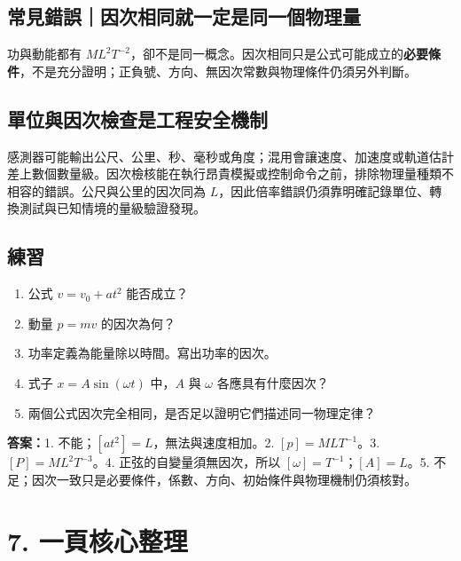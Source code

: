 \documentclass[11pt,a4paper]{article}
\providecommand{\tightlist}{%
  \setlength{\itemsep}{0pt}\setlength{\parskip}{0pt}}
\begin{document}
\subsection{常見錯誤｜因次相同就一定是同一個物理量}\label{ux5e38ux898bux932fux8aa4ux56e0ux6b21ux76f8ux540cux5c31ux4e00ux5b9aux662fux540cux4e00ux500bux7269ux7406ux91cf}

功與動能都有 \(ML^2T^{-2}\)，卻不是同一概念。因次相同只是公式可能成立的\textbf{必要條件}，不是充分證明；正負號、方向、無因次常數與物理條件仍須另外判斷。

\subsection{單位與因次檢查是工程安全機制}\label{ux55aeux4f4dux8207ux56e0ux6b21ux6aa2ux67e5ux662fux5de5ux7a0bux5b89ux5168ux6a5fux5236}

感測器可能輸出公尺、公里、秒、毫秒或角度；混用會讓速度、加速度或軌道估計差上數個數量級。因次檢核能在執行昂貴模擬或控制命令之前，排除物理量種類不相容的錯誤。公尺與公里的因次同為 \(L\)，因此倍率錯誤仍須靠明確記錄單位、轉換測試與已知情境的量級驗證發現。

\begin{HandoutSelfCheck}

\subsection{練習}\label{ux7df4ux7fd2-5}

\begin{enumerate}
\def\labelenumi{\arabic{enumi}.}
\tightlist
\item
  公式 \(v=v_0+at^2\) 能否成立？
\item
  動量 \(p=mv\) 的因次為何？
\item
  功率定義為能量除以時間。寫出功率的因次。
\item
  式子 \(x=A\sin(\omega t)\) 中，\(A\) 與 \(\omega\) 各應具有什麼因次？
\item
  兩個公式因次完全相同，是否足以證明它們描述同一物理定律？
\end{enumerate}

\textbf{答案：}1. 不能；\([at^2]=L\)，無法與速度相加。2. \([p]=MLT^{-1}\)。3. \([P]=ML^2T^{-3}\)。4. 正弦的自變量須無因次，所以 \([\omega]=T^{-1}\)；\([A]=L\)。5. 不足；因次一致只是必要條件，係數、方向、初始條件與物理機制仍須核對。

\end{HandoutSelfCheck}

\section{7. 一頁核心整理}\label{ux4e00ux9801ux6838ux5fc3ux6574ux7406}
\end{document}

